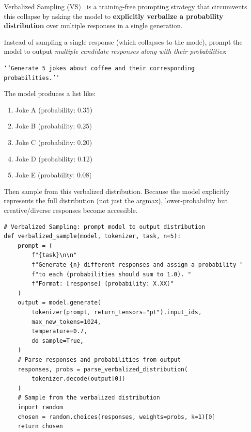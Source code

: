 Verbalized Sampling (VS)~\cite{zhang2025verbalized} is a training-free prompting strategy that circumvents this collapse by asking the model to \textbf{explicitly verbalize a probability distribution} over multiple responses in a single generation.

\begin{keybox}
Instead of sampling a single response (which collapses to the mode), prompt the model to output \emph{multiple candidate responses along with their probabilities}:

\texttt{‘‘Generate 5 jokes about coffee and their corresponding probabilities.’’}

The model produces a list like:

\begin{enumerate}
  \item Joke A (probability: 0.35)
  \item Joke B (probability: 0.25)
  \item Joke C (probability: 0.20)
  \item Joke D (probability: 0.12)
  \item Joke E (probability: 0.08)
\end{enumerate}

Then sample from this verbalized distribution. Because the model explicitly represents the full distribution (not just the argmax), lower-probability but creative/diverse responses become accessible.
\end{keybox}

\begin{lstlisting}[style=pythonstyle]
# Verbalized Sampling: prompt model to output distribution
def verbalized_sample(model, tokenizer, task, n=5):
    prompt = (
        f"{task}\n\n"
        f"Generate {n} different responses and assign a probability "
        f"to each (probabilities should sum to 1.0). "
        f"Format: [response] (probability: X.XX)"
    )
    output = model.generate(
        tokenizer(prompt, return_tensors="pt").input_ids,
        max_new_tokens=1024,
        temperature=0.7,
        do_sample=True,
    )
    # Parse responses and probabilities from output
    responses, probs = parse_verbalized_distribution(
        tokenizer.decode(output[0])
    )
    # Sample from the verbalized distribution
    import random
    chosen = random.choices(responses, weights=probs, k=1)[0]
    return chosen
\end{lstlisting}

